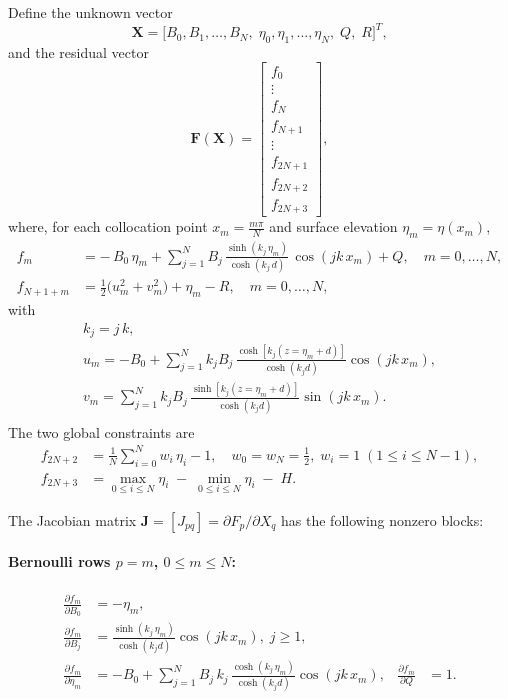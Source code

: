 \documentclass[11pt,letterpaper]{article}
\begin{document}
Define the unknown vector
\[
\mathbf{X} = \bigl[B_{0}, B_{1},\dots,B_{N},\;\eta_{0},\eta_{1},\dots,\eta_{N},\;Q,\;R\bigr]^{T},
\]
and the residual vector
\[
\mathbf{F}(\mathbf{X}) =
\begin{bmatrix}
f_{0}\\
\vdots\\
f_{N}\\[0.5ex]
f_{N+1}\\
\vdots\\
f_{2N+1}\\[0.5ex]
f_{2N+2}\\
f_{2N+3}
\end{bmatrix},
\]
where, for each collocation point \(x_{m} = \tfrac{m\pi}{N}\) and surface elevation \(\eta_{m} = \eta(x_{m})\),
\begin{align}
f_{m} &= -\,B_{0}\,\eta_{m}
       + \sum_{j=1}^{N} B_{j}\,\frac{\sinh(k_{j}\,\eta_{m})}{\cosh(k_{j}\,d)}\,\cos(jk\,x_{m})
       + Q,
       \quad m=0,\dots,N,
       \\
f_{N+1+m} &= \tfrac12\bigl(u_{m}^{2}+v_{m}^{2}\bigr)
            + \eta_{m} - R,
       \quad m=0,\dots,N,
\end{align}
with
\begin{align}
k_{j} = j\,k, \\[0.5ex]
u_{m} = -B_{0} + \sum_{j=1}^{N} k_{j}B_{j}\,\frac{\cosh[k_{j}(z=\eta_{m}+d)]}{\cosh(k_{j}d)}\cos(jk\,x_{m}),
 \\[0.5ex]
v_{m} = \sum_{j=1}^{N} k_{j}B_{j}\,\frac{\sinh[k_{j}(z=\eta_{m}+d)]}{\cosh(k_{j}d)}\sin(jk\,x_{m}). \\[0.5ex]
\end{align}
The two global constraints are
\begin{align}
f_{2N+2} &= \frac{1}{N}\sum_{i=0}^{N} w_i\,\eta_{i} - 1,
\quad w_{0}=w_{N}=\tfrac12,\;w_{i}=1\;(1\le i\le N-1),
\\
f_{2N+3} &= \max_{0\le i\le N}\!\eta_{i}\;-\;\min_{0\le i\le N}\!\eta_{i}\;-\;H.
\end{align}

The Jacobian matrix \(\mathbf{J} = [J_{pq}]=\partial F_{p}/\partial X_{q}\) has the following nonzero blocks:

\paragraph{Bernoulli rows \(p=m\), \(0\le m\le N\):}
\begin{align}
\frac{\partial f_{m}}{\partial B_{0}}
  &= -\eta_{m},
  \\[0.5ex]
\frac{\partial f_{m}}{\partial B_{j}}
  &= \frac{\sinh(k_{j}\,\eta_{m})}{\cosh(k_{j}d)}\cos(jk\,x_{m}),\; j\ge1,
  \\
\frac{\partial f_{m}}{\partial \eta_{m}}
  &= -B_{0}
     + \sum_{j=1}^{N}B_{j}\,k_{j}\,\frac{\cosh(k_{j}\,\eta_{m})}{\cosh(k_{j}d)}\cos(jk\,x_{m}),
  &
\frac{\partial f_{m}}{\partial Q}
  &= 1.
\end{align}
\end{document}

